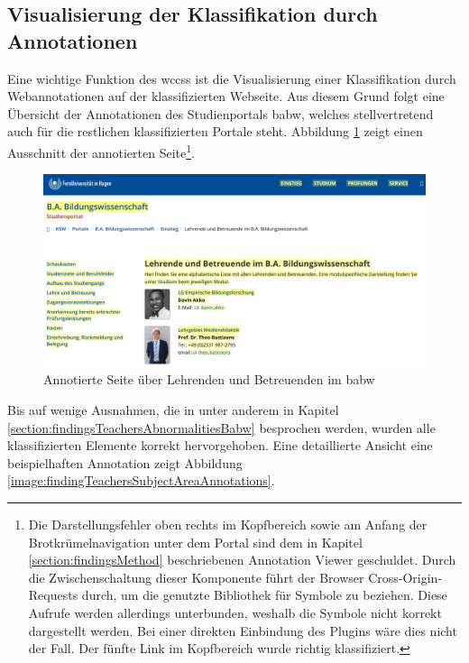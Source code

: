\subsection{Visualisierung der Klassifikation durch Annotationen}
    Eine wichtige Funktion des \glspl{wccs}
    ist die Visualisierung einer Klassifikation durch Webannotationen
    auf der klassifizierten Webseite.
    Aus diesem Grund folgt eine Übersicht der Annotationen
    des Studienportals \gls{babw},
    welches stellvertretend auch für die restlichen klassifizierten Portale steht.
    Abbildung \ref{image:findingTeachersAnnotationsOverview}
    zeigt einen Ausschnitt der annotierten
    Seite\footnote{Die Darstellungsfehler oben rechts im Kopfbereich
    sowie am Anfang der Brotkrümelnavigation unter dem Portal
    sind dem in Kapitel \ref{section:findingsMethod} beschriebenen
    Annotation Viewer geschuldet.
    Durch die Zwischenschaltung dieser Komponente
    führt der Browser Cross-Origin-Requests durch,
    um die genutzte Bibliothek für Symbole zu beziehen.
    Diese Aufrufe werden allerdings unterbunden,
    weshalb die Symbole nicht korrekt dargestellt werden.
    Bei einer direkten Einbindung des Plugins wäre dies nicht der Fall.
    Der fünfte Link im Kopfbereich wurde richtig klassifiziert.}.

    \begin{figure}[htb]
        \centering
        \includegraphics[width=\textwidth]{../resources/findings/case-study-1/babw/annotations/overview.png}
        \caption{Annotierte Seite über Lehrenden und Betreuenden im \gls{babw}}
        \label{image:findingTeachersAnnotationsOverview}
    \end{figure}

    Bis auf wenige Ausnahmen, die in unter anderem in
    Kapitel \ref{section:findingsTeachersAbnormalitiesBabw} besprochen werden,
    wurden alle klassifizierten Elemente korrekt hervorgehoben.
    Eine detaillierte Ansicht eine beispielhaften Annotation zeigt
    Abbildung \ref{image:findingTeachersSubjectAreaAnnotations}.


